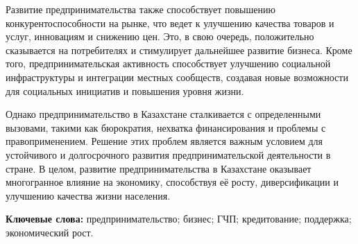 Развитие предпринимательства также способствует повышению
конкурентоспособности на рынке, что ведет к улучшению качества товаров и
услуг, инновациям и снижению цен. Это, в свою очередь, положительно
сказывается на потребителях и стимулирует дальнейшее развитие бизнеса.
Кроме того, предпринимательская активность способствует улучшению
социальной инфраструктуры и интеграции местных сообществ, создавая новые
возможности для социальных инициатив и повышения уровня жизни.

Однако предпринимательство в Казахстане сталкивается с определенными
вызовами, такими как бюрократия, нехватка финансирования и проблемы с
правоприменением. Решение этих проблем является важным условием для
устойчивого и долгосрочного развития предпринимательской деятельности в
стране. В целом, развитие предпринимательства в Казахстане оказывает
многогранное влияние на экономику, способствуя её росту, диверсификации
и улучшению качества жизни населения.
\begingroup
\setlength{\parskip}{0pt}

{\bfseries Ключевые слова:} предпринимательство; бизнес; ГЧП; кредитование;
поддержка; экономический рост.

